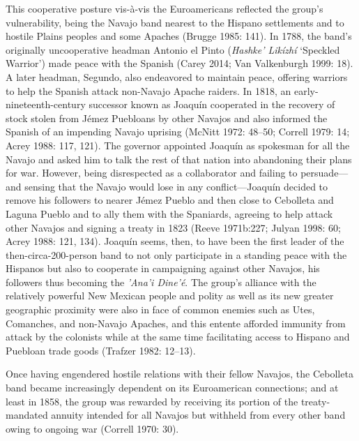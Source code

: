 This cooperative posture vis-à-vis the Euroamericans reflected the group’s vulnerability, being the Navajo band nearest to the Hispano settlements and to hostile Plains peoples and some Apaches (Brugge 1985: 141).  In 1788, the band’s originally uncooperative headman Antonio el Pinto (\textit{Hashke’ Likízhí} ‘Speckled Warrior’) made peace with the Spanish (Carey 2014; Van Valkenburgh 1999: 18).  A later headman, Segundo, also endeavored to maintain peace, offering warriors to help the Spanish attack non-Navajo Apache raiders.  In 1818, an early-nineteenth-century successor known as Joaquín cooperated in the recovery of stock stolen from Jémez Puebloans by other Navajos and also informed the Spanish of an impending Navajo uprising (McNitt 1972: 48–50; Correll 1979: 14; Acrey 1988: 117, 121).  The governor appointed Joaquín as spokesman for all the Navajo and asked him to talk the rest of that nation into abandoning their plans for war.  However, being disrespected as a collaborator and failing to persuade—and sensing that the Navajo would lose in any conflict—Joaquín decided to remove his followers to nearer Jémez Pueblo and then close to Cebolleta and Laguna Pueblo and to ally them with the Spaniards, agreeing to help attack other Navajos and signing a treaty in 1823 (Reeve 1971b:227; Julyan 1998: 60; Acrey 1988: 121, 134).  Joaquín seems, then, to have been the first leader of the then-circa-200-person band to not only participate in a standing peace with the Hispanos but also to cooperate in campaigning against other Navajos, his followers thus becoming the \textit{’Ana’i Dine’é}.  The group’s alliance with the relatively powerful New Mexican people and polity as well as its new greater geographic proximity were also in face of common enemies such as Utes, Comanches, and non-Navajo Apaches, and this entente afforded immunity from attack by the colonists while at the same time facilitating access to Hispano and Puebloan trade goods (Trafzer 1982: 12–13).

  Once having engendered hostile relations with their fellow Navajos, the Cebolleta band became increasingly dependent on its Euroamerican connections; and at least in 1858, the group was rewarded by receiving its portion of the treaty-mandated annuity intended for all Navajos but withheld from every other band owing to ongoing war (Correll 1970: 30).

